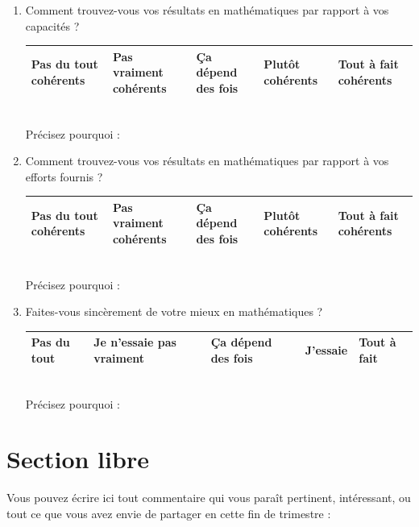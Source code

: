 \documentclass[oneside,12pt]{article}          %
\begin{document}
\begin{enumerate}[itemsep=5mm]

	\item Comment trouvez-vous vos résultats en mathématiques par rapport à vos capacités ?
	
		\hspace{\linewidth-\textwidth}
		\renewcommand{\arraystretch}{1.5}
		\begin{tabular}{| P{0.175\textwidth} | P{0.175\textwidth} | P{0.175\textwidth} | P{0.175\textwidth} | P{0.175\textwidth} |} \hline
			Pas du tout cohérents & Pas vraiment cohérents & Ça dépend des fois & Plutôt cohérents & Tout à fait cohérents\\ \hline
		\end{tabular} \\
		
		\hspace{\linewidth-\textwidth} Précisez pourquoi : 
		
		
		
	\item Comment trouvez-vous vos résultats en mathématiques par rapport à vos efforts fournis ?
	
		\hspace{\linewidth-\textwidth}
		\renewcommand{\arraystretch}{1.5}
		\begin{tabular}{| P{0.175\textwidth} | P{0.175\textwidth} | P{0.175\textwidth} | P{0.175\textwidth} | P{0.175\textwidth} |} \hline
			Pas du tout cohérents & Pas vraiment cohérents & Ça dépend des fois & Plutôt cohérents & Tout à fait cohérents\\ \hline
		\end{tabular} \\
		
		\hspace{\linewidth-\textwidth} Précisez pourquoi : 
		
		
		
	\item Faites-vous sincèrement de votre mieux en mathématiques ?
	
		\hspace{\linewidth-\textwidth}
		\renewcommand{\arraystretch}{1.5}
		\begin{tabular}{| P{0.175\textwidth} | P{0.175\textwidth} | P{0.175\textwidth} | P{0.175\textwidth} | P{0.175\textwidth} |} \hline
			Pas du tout & Je n'essaie pas vraiment & Ça dépend des fois & J'essaie & Tout à fait\\ \hline
		\end{tabular} \\
		
		\hspace{\linewidth-\textwidth} Précisez pourquoi : 

\end{enumerate}


\section{Section libre}

Vous pouvez écrire ici tout commentaire qui vous paraît pertinent, intéressant, ou tout ce que vous avez envie de partager en cette fin de trimestre : \\[5pt]

\end{document}
